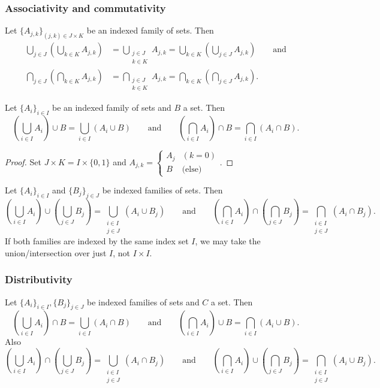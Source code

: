 \subsubsection{Associativity and commutativity}
\begin{lemma} \label{lemma:setAssociativityCommutativity}
Let $\{A_{j,k}\}_{(j,k) \in J\times K}$ be an indexed family of sets. Then
\begin{align*}
\bigcup_{j\in J}\left(\bigcup_{k\in K}A_{j,k}\right) &= \bigcup_{\substack{j\in J \\ k\in K}}A_{j,k} = \bigcup_{k\in K}\left(\bigcup_{j\in J}A_{j,k}\right) \qquad\text{and} \\
\bigcap_{j\in J}\left(\bigcap_{k\in K}A_{j,k}\right) &= \bigcap_{\substack{j\in J \\ k\in K}}A_{j,k} = \bigcap_{k\in K}\left(\bigcap_{j\in J}A_{j,k}\right).
\end{align*}
\end{lemma}
\begin{corollary}
Let $\{A_{i}\}_{i \in I}$ be an indexed family of sets and $B$ a set. Then
\[ \left(\bigcup_{i\in I}A_i\right)\cup B = \bigcup_{i\in I}(A_i\cup B) \qquad\text{and}\qquad \left(\bigcap_{i\in I}A_i\right)\cap B = \bigcap_{i\in I}(A_i\cap B). \]
\end{corollary}
\begin{proof}
Set $J\times K = I\times\{0,1\}$ and $A_{j,k} = \begin{cases}
A_j & (k=0) \\
B & \text{(else)}
\end{cases}$.
\end{proof}
\begin{corollary}
Let $\{A_{i}\}_{i \in I}$ and $\{B_{j}\}_{j \in J}$ be indexed families of sets. Then
\[ \left(\bigcup_{i\in I}A_i\right)\cup \left(\bigcup_{j\in J}B_j\right) = \bigcup_{\substack{i\in I\\j\in J}}(A_i\cup B_j) \qquad\text{and}\qquad \left(\bigcap_{i\in I}A_i\right)\cap \left(\bigcap_{j\in J}B_j\right) = \bigcap_{\substack{i\in I\\j\in J}}(A_i\cap B_j). \]
If both families are indexed by the same index set $I$, we may take the union/intersection over just $I$, not $I\times I$.
\end{corollary}

\subsubsection{Distributivity}
\begin{lemma} \label{lemma:setDistributivity}
Let $\{A_{i}\}_{i \in I}, \{B_{j}\}_{j \in J}$ be indexed families of sets and $C$ a set. Then
\[ \left(\bigcup_{i\in I}A_i\right)\cap B = \bigcup_{i\in I}(A_i\cap B) \qquad\text{and}\qquad \left(\bigcap_{i\in I}A_i\right)\cup B = \bigcap_{i\in I}(A_i\cup B). \]
Also
\[ \left(\bigcup_{i\in I}A_i\right)\cap \left(\bigcup_{j\in J}B_j\right) = \bigcup_{\substack{i\in I\\j\in J}}(A_i\cap B_j) \qquad\text{and}\qquad \left(\bigcap_{i\in I}A_i\right)\cup \left(\bigcap_{j\in J}B_j\right) = \bigcap_{\substack{i\in I\\j\in J}}(A_i\cup B_j). \]
\end{lemma}

